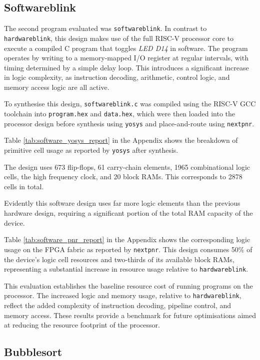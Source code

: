 \documentclass[a4paper,10pt]{article}
\begin{document}
\subsection{Softwareblink}
\label{sec:Softwareblink}

The second program evaluated was \texttt{softwareblink}. 
In contrast to \texttt{hardwareblink}, 
this design makes use of the full RISC-V processor core 
to execute a compiled C program that toggles \textit{LED D14} in software. 
The program operates by writing to a memory-mapped I/O register at regular intervals, 
with timing determined by a simple delay loop. 
This introduces a significant increase in logic complexity, 
as instruction decoding, arithmetic, control logic, and memory access logic 
are all active.

To synthesise this design, \texttt{softwareblink.c} was compiled 
using the RISC-V GCC toolchain into \texttt{program.hex} and \texttt{data.hex}, 
which were then loaded into the processor design 
before synthesis using \texttt{yosys} and place-and-route using \texttt{nextpnr}.

Table \ref{tab:software_yosys_report} in the Appendix 
shows the breakdown of primitive cell usage 
as reported by \texttt{yosys} after synthesis.

The design uses 673 flip-flops,
61 carry-chain elements,
1965 combinational logic cells,
the high frequency clock,
and 20 block RAMs.
This corresponds to 2878 cells in total.

Evidently this software design uses far more logic elements
than the previous hardware design,
requiring a significant portion of the total RAM capacity of the device.

Table \ref{tab:software_pnr_report} in the Appendix
shows the corresponding logic usage 
on the FPGA fabric as reported by \texttt{nextpnr}. 
This design consumes 50\% of the device's logic cell resources 
and two-thirds of its available block RAMs, 
representing a substantial increase in resource usage 
relative to \texttt{hardwareblink}.

This evaluation establishes the baseline resource cost 
of running programs on the processor. 
The increased logic and memory usage, relative to \texttt{hardwareblink}, 
reflect the added complexity of 
instruction decoding, pipeline control, and memory access. 
These results provide a benchmark for future optimisations 
aimed at reducing the resource footprint of the processor.

\subsection{Bubblesort}
\label{sec:Bubblesort}
\end{document}
